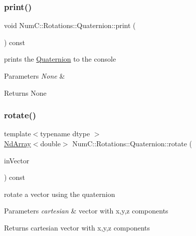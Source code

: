 \subsubsection{\texorpdfstring{print()}{print()}}
{\footnotesize\ttfamily void Num\+C\+::\+Rotations\+::\+Quaternion\+::print (\begin{DoxyParamCaption}{ }\end{DoxyParamCaption}) const\hspace{0.3cm}{\ttfamily [inline]}}

prints the \mbox{\hyperlink{class_num_c_1_1_rotations_1_1_quaternion}{Quaternion}} to the console


\begin{DoxyParams}{Parameters}
{\em None} & \\
\hline
\end{DoxyParams}
\begin{DoxyReturn}{Returns}
None 
\end{DoxyReturn}
\mbox{\label{class_num_c_1_1_rotations_1_1_quaternion_a4fafcb2d64f0a9ef1f16f4b15a2324e7}} 
\subsubsection{\texorpdfstring{rotate()}{rotate()}}
{\footnotesize\ttfamily template$<$typename dtype $>$ \\
\mbox{\hyperlink{class_num_c_1_1_nd_array}{Nd\+Array}}$<$double$>$ Num\+C\+::\+Rotations\+::\+Quaternion\+::rotate (\begin{DoxyParamCaption}\item[{const \mbox{\hyperlink{class_num_c_1_1_nd_array}{Nd\+Array}}$<$ dtype $>$ \&}]{in\+Vector }\end{DoxyParamCaption}) const\hspace{0.3cm}{\ttfamily [inline]}}

rotate a vector using the quaternion


\begin{DoxyParams}{Parameters}
{\em cartesian} & vector with x,y,z components \\
\hline
\end{DoxyParams}
\begin{DoxyReturn}{Returns}
cartesian vector with x,y,z components 
\end{DoxyReturn}
\mbox{\label{class_num_c_1_1_rotations_1_1_quaternion_a5d3d13ed55c5e08fd35e3d793eb62a70}} 
